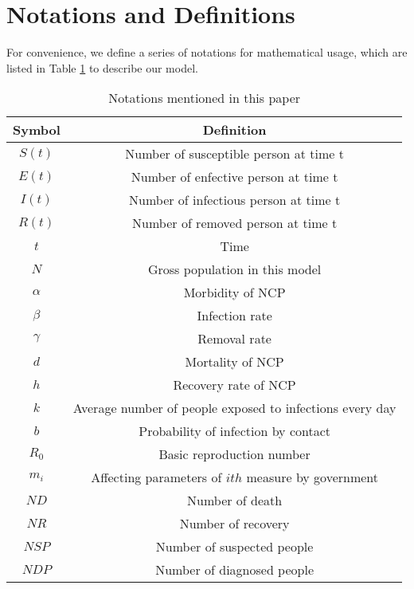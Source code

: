 \documentclass{mcmthesis}
\begin{document}
\section{Notations and Definitions}\label{S3}
    For convenience, we define a series of notations for mathematical usage, which are listed in Table \ref{notation} to describe our model.
\begin{table}[H]\large
    \centering
    \caption{Notations mentioned in this paper}
    \label{notation}
    \begin{tabular}{c c}
\toprule[2pt]
        Symbol & Definition\\
\hline
    $S(t)$ & Number of susceptible person at time t\\
    $E(t)$ & Number of enfective person at time t\\
    $I(t)$ & Number of infectious person at time t\\
    $R(t)$ & Number of removed person at time t\\
    $t$ & Time\\
    $N$ & Gross population in this model\\
    $\alpha$ & Morbidity of NCP\\
    $\beta$ & Infection rate\\
    $\gamma$ & Removal rate\\
    $d$ & Mortality of NCP\\
    $h$ & Recovery rate of NCP\\
    $k$ & Average number of people exposed to infections every day \\
    $b$ & Probability of infection by contact\\
    $R_0$ & Basic reproduction number\\
    $m_i$ & Affecting parameters of $ith$ measure by government \\
    $ND$ & Number of death\\
    $NR$ & Number of recovery\\
    $NSP$ & Number of suspected people\\
    $NDP$ & Number of diagnosed people\\
\bottomrule[2pt]
    \end{tabular}
\end{table}
\end{document}
